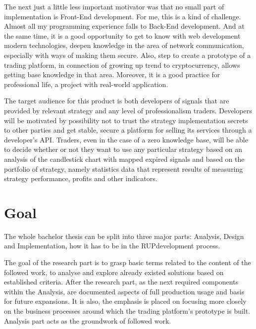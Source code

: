 \documentclass[thesis=B,english]{FITthesis}[2019/03/06]
\begin{document}

The next just a little less important motivator was that no small part of implementation is Front-End development. For me, this is a kind of challenge. Almost all my programming experience falls to Back-End development. And at the same time, it is a good opportunity to get to know with web development modern technologies, deepen knowledge in the area of network communication, especially with ways of making them secure. Also, step to create a prototype of a trading platform, in connection of growing up trend to cryptocurrency, allows getting base knowledge in that area. Moreover,  it is a good practice for professional life, a project with real-world application.

The target audience for this product is both developers of signals that are provided by relevant strategy and any level of professionalism traders. Developers will be motivated by possibility not to trust the strategy implementation secrets to other parties and get stable, secure a platform for selling its services through a developer's API.
Traders, even in the case of a zero knowledge base, will be able to decide whether or not they want to use any particular strategy based on an analysis of the candlestick chart with mapped expired signals and based on the portfolio of strategy, namely statistics data that represent results of measuring strategy performance, profits and other indicators.

\section{Goal}
The whole bachelor thesis can be split into three major parts: Analysis, Design and Implementation, how it has to be in the RUP\footnotemark development process.


The goal of the research part is to grasp basic terms related to the content of the followed work, to analyse and explore already existed solutions based on established criteria. After the research part, as the next required components within the Analysis, are documented aspects of full production usage and basis for future expansions. It is also, the emphasis is placed on focusing more closely on the business processes around which the trading platform's prototype is built. Analysis part acts as the groundwork of followed work. 
\end{document}

